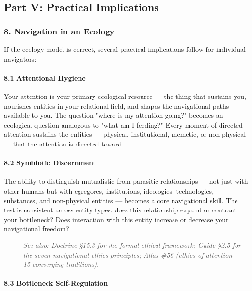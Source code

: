 \subsection*{Part V: Practical Implications}


\subsubsection*{8. Navigation in an Ecology}


If the ecology model is correct, several practical implications follow for individual navigators:


\paragraph*{8.1 Attentional Hygiene}


Your attention is your primary ecological resource — the thing that sustains you, nourishes entities in your relational field, and shapes the navigational paths available to you. The question "where is my attention going?" becomes an ecological question analogous to "what am I feeding?" Every moment of directed attention sustains the entities — physical, institutional, memetic, or non-physical — that the attention is directed toward.


\paragraph*{8.2 Symbiotic Discernment}


The ability to distinguish mutualistic from parasitic relationships — not just with other humans but with egregores, institutions, ideologies, technologies, substances, and non-physical entities — becomes a core navigational skill. The test is consistent across entity types: does this relationship expand or contract your bottleneck? Does interaction with this entity increase or decrease your navigational freedom?


\begin{quote}
\itshape
\textit{See also: Doctrine §15.3 for the formal ethical framework; Guide §2.5 for the seven navigational ethics principles; Atlas \#56 (ethics of attention — 15 converging traditions).}
\end{quote}


\paragraph*{8.3 Bottleneck Self-Regulation}


